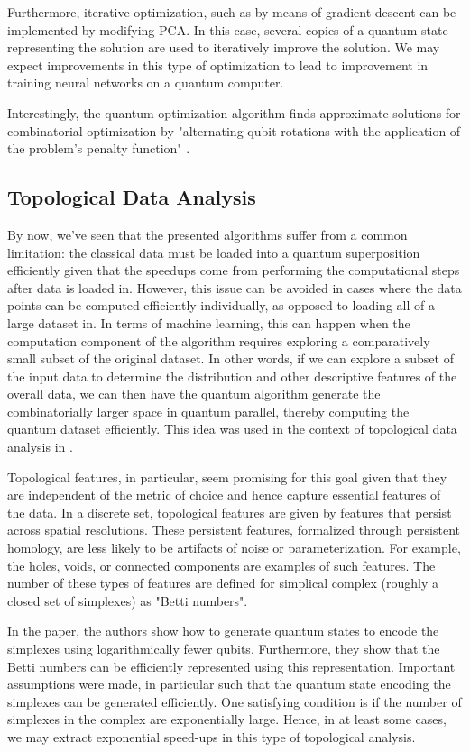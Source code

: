 \documentclass[12]{amsart}
\newcommand\0{\mathbf{0}}
\newcommand\<{\langle}
\renewcommand\>{\rangle}
\begin{document}
Furthermore, iterative optimization, such as by means of gradient descent can be implemented by modifying PCA. In this case, several copies of a quantum state representing the solution are used to iteratively improve the solution. We may expect improvements in this type of optimization to lead to improvement in training neural networks on a quantum computer. 

Interestingly, the quantum optimization algorithm finds approximate solutions for combinatorial optimization by "alternating qubit rotations with the application of the problem's penalty function" \cite{biamonte2017quantum}.

\subsection{Topological Data Analysis}

By now, we've seen that the presented algorithms suffer from a common limitation: the classical data must be loaded into a quantum superposition efficiently given that the speedups come from performing the computational steps after data is loaded in. However, this issue can be avoided in cases where the data points can be computed efficiently individually, as opposed to loading all of a large dataset in. In terms of machine learning, this can happen when the computation component of the algorithm requires exploring a comparatively small subset of the original dataset. In other words, if we can explore a subset of the input data to determine the distribution and other descriptive features of the overall data, we can then have the quantum algorithm generate the combinatorially larger space in quantum parallel, thereby computing the quantum dataset efficiently. This idea was used in the context of topological data analysis in \cite{lloyd2016quantum}.

Topological features, in particular, seem promising for this goal given that they are independent of the metric of choice and hence capture essential features of the data. In a discrete set, topological features are given by features that persist across spatial resolutions. These persistent features, formalized through persistent homology, are less likely to be artifacts of noise or parameterization. For example, the holes, voids, or connected components are examples of such features. The number of these types of features are defined for simplical complex (roughly a closed set of simplexes) as "Betti numbers". 

In the paper, the authors show how to generate quantum states to encode the simplexes using logarithmically fewer qubits. Furthermore, they show that the Betti numbers can be efficiently represented using this representation. Important assumptions were made, in particular such that the quantum state encoding the simplexes can be generated efficiently. One satisfying condition is if the number of simplexes in the complex are exponentially large. Hence, in at least some cases, we may extract exponential speed-ups in this type of topological analysis.
\end{document}
